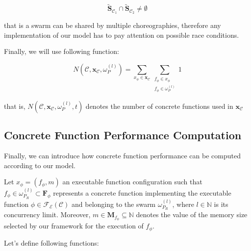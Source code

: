 \documentclass[12pt,a4paper]{report}
\newcommand{\N}{\mathbb{N}}
\begin{document}
\begin{equation}
	\widetilde{\textbf{S}}_{\mathcal{C}_1} \cap \widetilde{\textbf{S}}_{\mathcal{C}_2} \neq \emptyset
\end{equation}

that is a swarm can be shared by multiple choreographies, therefore any implementation of our model has to pay attention on possible race conditions. 

Finally, we will use following function:

\begin{equation}
	N(\mathcal{C},\textbf{x}_{\mathcal{C}},\omega_{P}^{(l)}) = \sum_{x_{\phi} \in \textbf{x}_{\mathcal{C}}} \sum_{\substack{f_{\phi} \in x_{\phi} \\ f_{\phi} \in \omega_{P}^{(l)}}} 1
\end{equation}

that is, $N(\mathcal{C},\textbf{x}_{\mathcal{C}},\omega_{P}^{(l)},t)$ denotes the number of concrete functions used in $\textbf{x}_{\mathcal{C}}$ 


\subsection{Concrete Function Performance Computation}

Finally, we can introduce how concrete function performance can be computed according to our model.

Let $x_{\phi} = (f_{\phi},m)$ an executable function configuration such that $f_{\phi} \in \omega_{P_R}^{(l)} \subset \textbf{F}_{\phi}$ represents a concrete function implementing the executable function $\phi \in \mathscr{F_E}(\mathcal{C})$ and belonging to the swarm $\omega_{P_R}^{(l)}$, where $l \in \N$ is its concurrency limit. Moreover, $m \in \textbf{M}_{f_{\phi}} \subseteq \N$ denotes the value of the memory size selected by our framework for the execution of $f_{\phi}$.

Let's define following functions:
\end{document}
